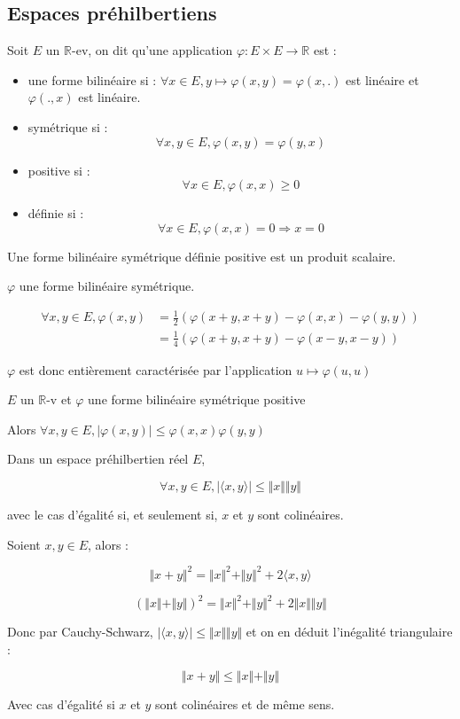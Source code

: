 \documentclass[a4paper,12pt]{book}
\newcommand{\Def}[2]{\begin{tcolorbox}[colback=white,colframe=red!10!green!20!blue!75!, title=Définition : #1]#2\end{tcolorbox}}
\newcommand{\Thr}[2]{\begin{tcolorbox}[sharp corners, colback=white,colframe=red!10!blue!30!green!75!, title=Théorème : #1]#2\end{tcolorbox}}
\def\R{\mathbb{R}}
\begin{document}
\subsection{Espaces préhilbertiens}
\Def{}{Soit $E$ un $\R$-ev, on dit qu'une application $\varphi:E\times E\to\R$ est :\begin{itemize}
\item une forme bilinéaire si : $\forall x\in E, y\mapsto \varphi(x,y)=\varphi(x, .)$ est linéaire et $\varphi(., x)$ est linéaire.
\item symétrique si : $$\forall x,y\in E, \varphi(x,y)=\varphi(y,x)$$
\item positive si : $$\forall x\in E, \varphi(x, x)\geq 0$$
\item définie si : $$\forall x\in E, \varphi(x, x)=0\Rightarrow x=0$$
\end{itemize}
Une forme bilinéaire symétrique définie positive est un produit scalaire.}
\Thr{Identités polaires}{$\varphi$ une forme bilinéaire symétrique.
\par \begin{align*}\forall x, y\in E, \varphi(x, y) &=\frac{1}{2}(\varphi(x+y, x+y) - \varphi(x, x) - \varphi(y,y))\\
& = \frac{1}{4}(\varphi(x+y, x+y) - \varphi(x-y, x-y))\end{align*}
\par $\varphi$ est donc entièrement caractérisée par l'application $u\mapsto \varphi(u,u)$}
\Thr{Cauchy-Schwarz}{$E$ un $\R$-v et $\varphi$ une forme bilinéaire symétrique positive
\par Alors $\forall x,y\in E, \vert\varphi(x,y)\vert\leq \varphi(x, x)\varphi(y,y)$
\par Dans un espace préhilbertien réel $E$, 
\par $$\forall x,y\in E, \vert\langle x,y\rangle \vert \leq \Vert x\Vert\Vert y\Vert$$
\par avec le cas d'égalité si, et seulement si, $x$ et $y$ sont colinéaires.}
\Thr{Inégalité triangulaire}{Soient $x, y\in E$, alors :
\par $$\Vert x+y\Vert^2=\Vert x\Vert^2+\Vert y\Vert^2+2\langle x,y\rangle$$
\par $$(\Vert x\Vert+\Vert y\Vert)^2=\Vert x\Vert^2+\Vert y\Vert^2 + 2\Vert x\Vert\Vert y\Vert$$
\par Donc par Cauchy-Schwarz, $\vert\langle x, y\rangle\vert\leq \Vert x\Vert\Vert y\Vert$ et on en déduit l'inégalité triangulaire :
\par $$\Vert x+y\Vert\leq \Vert x\Vert+\Vert y\Vert$$
\par Avec cas d'égalité si $x$ et $y$ sont colinéaires et de même sens.}
\end{document}
